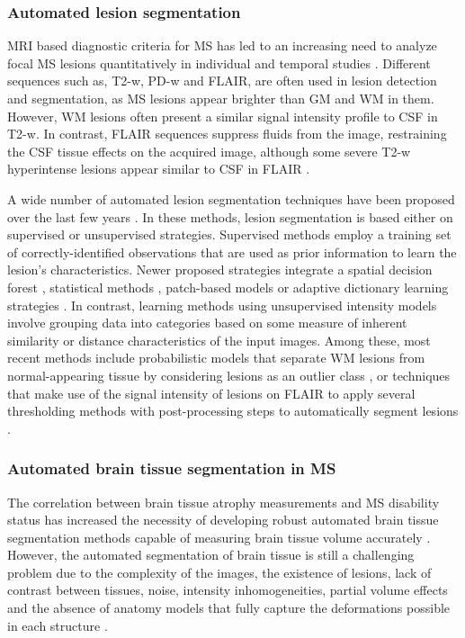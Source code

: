 \subsubsection{Automated lesion segmentation}

MRI based diagnostic criteria for MS has led to an increasing need to analyze focal MS lesions quantitatively in individual and temporal studies \cite{Cabezas2014, Polman2011}. Different sequences such as, T2-w, PD-w and FLAIR, are often used in lesion detection and segmentation, as MS lesions appear brighter than GM and WM in them. However, WM lesions often present a similar signal intensity profile to CSF in T2-w. In contrast, FLAIR sequences suppress fluids from the image, restraining the CSF tissue effects on the acquired image, although some severe T2-w hyperintense lesions appear similar to CSF in FLAIR \cite{Harmouche2015}. 

A wide number of automated lesion segmentation techniques have been proposed over the last few years \cite{Garcia-Lorenzo2013, Llado2012}. In these methods, lesion segmentation is based either on supervised or unsupervised strategies. Supervised methods employ a training set of correctly-identified observations that are used as prior information to learn the lesion's characteristics. Newer proposed strategies integrate a spatial decision forest \cite{Geremia2011}, statistical methods \cite{Sweeney2013}, patch-based models \cite{Guizard2015} or adaptive dictionary learning strategies \cite{Deshpande2015}. In contrast, learning methods using unsupervised intensity models involve grouping data into categories based on some measure of inherent similarity or distance characteristics of the input images. Among these, most recent methods include probabilistic models that separate WM lesions from normal-appearing tissue by considering lesions as an outlier class \cite{Harmouche2015,Jain2015,Tomas-Fernandez2015}, or techniques that make use of the signal intensity of lesions on FLAIR to apply several thresholding methods with post-processing steps to automatically segment lesions \cite{Roura2015, Schmidt2012}. 


\subsubsection{Automated brain tissue segmentation in MS}
\label{subsec:lesion_segmentation}
The correlation between brain tissue atrophy measurements and MS disability status \cite{Filippi2013, Fisher2008} has increased the necessity of developing robust automated brain tissue segmentation methods capable of measuring brain tissue volume accurately \cite{Giorgio2013}. However, the automated segmentation of brain tissue is still a challenging problem due to the complexity of the images, the existence of lesions, lack of contrast between tissues, noise, intensity inhomogeneities, partial volume effects  and the absence of anatomy models that fully capture the deformations possible in each structure \cite{Cabezas2011, Kapur1996}. 

